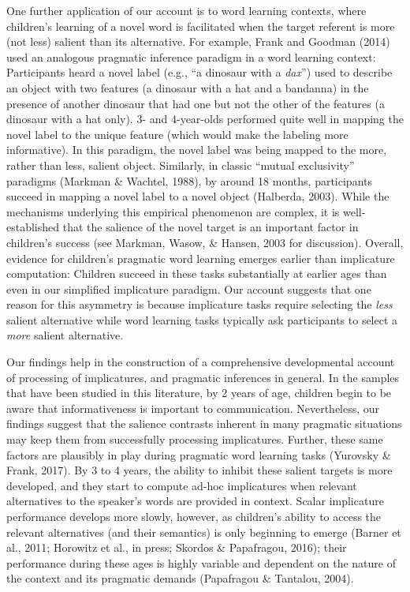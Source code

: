 \documentclass[man]{apa6}
\theoremstyle{definition}
\theoremstyle{definition}
\theoremstyle{definition}
\theoremstyle{remark}
\begin{document}
One further application of our account is to word learning contexts,
where children's learning of a novel word is facilitated when the target
referent is more (not less) salient than its alternative. For example,
Frank and Goodman (2014) used an analogous pragmatic inference paradigm
in a word learning context: Participants heard a novel label (e.g.,
\enquote{a dinosaur with a \emph{dax}}) used to describe an object with
two features (a dinosaur with a hat and a bandanna) in the presence of
another dinosaur that had one but not the other of the features (a
dinosaur with a hat only). 3- and 4-year-olds performed quite well in
mapping the novel label to the unique feature (which would make the
labeling more informative). In this paradigm, the novel label was being
mapped to the more, rather than less, salient object. Similarly, in
classic \enquote{mutual exclusivity} paradigms (Markman \& Wachtel,
1988), by around 18 months, participants succeed in mapping a novel
label to a novel object (Halberda, 2003). While the mechanisms
underlying this empirical phenomenon are complex, it is well-established
that the salience of the novel target is an important factor in
children's success (see Markman, Wasow, \& Hansen, 2003 for discussion).
Overall, evidence for children's pragmatic word learning emerges earlier
than implicature computation: Children succeed in these tasks
substantially at earlier ages than even in our simplified implicature
paradigm. Our account suggests that one reason for this asymmetry is
because implicature tasks require selecting the \emph{less} salient
alternative while word learning tasks typically ask participants to
select a \emph{more} salient alternative.

Our findings help in the construction of a comprehensive developmental
account of processing of implicatures, and pragmatic inferences in
general. In the samples that have been studied in this literature, by 2
years of age, children begin to be aware that informativeness is
important to communication. Nevertheless, our findings suggest that the
salience contrasts inherent in many pragmatic situations may keep them
from successfully processing implicatures. Further, these same factors
are plausibly in play during pragmatic word learning tasks (Yurovsky \&
Frank, 2017). By 3 to 4 years, the ability to inhibit these salient
targets is more developed, and they start to compute ad-hoc implicatures
when relevant alternatives to the speaker's words are provided in
context. Scalar implicature performance develops more slowly, however,
as children's ability to access the relevant alternatives (and their
semantics) is only beginning to emerge (Barner et al., 2011; Horowitz et
al., in press; Skordos \& Papafragou, 2016); their performance during
these ages is highly variable and dependent on the nature of the context
and its pragmatic demands (Papafragou \& Tantalou, 2004).
\end{document}
